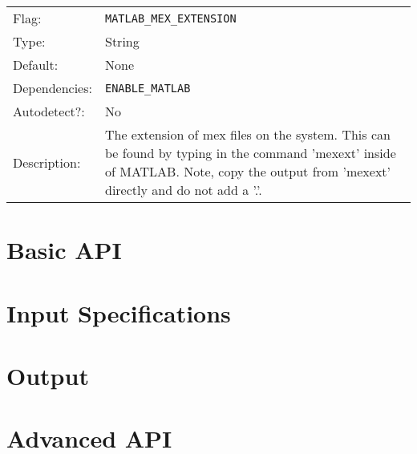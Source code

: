 \documentclass{report}
\begin{document}
\begin{center}
\begin{longtable}{lp{}}
\\
Flag:         &\texttt{MATLAB\_MEX\_EXTENSION}\\
Type:         &String \\
Default:      &None \\
Dependencies: &\texttt{ENABLE\_MATLAB}\\
Autodetect?:  &No \\
Description:  &The extension of mex files on the system.  This can be found
              by typing in the command 'mexext' inside of MATLAB.  Note, copy
              the output from 'mexext' directly and do not add a '.'.
\end{longtable}
\end{center}
       
\chapter{Basic API}\label{ch:Basic}
\chapter{Input Specifications}\label{ch:Input}
\chapter{Output}\label{ch:Output}
\chapter{Advanced API}\label{ch:Advanced}
\end{document}
